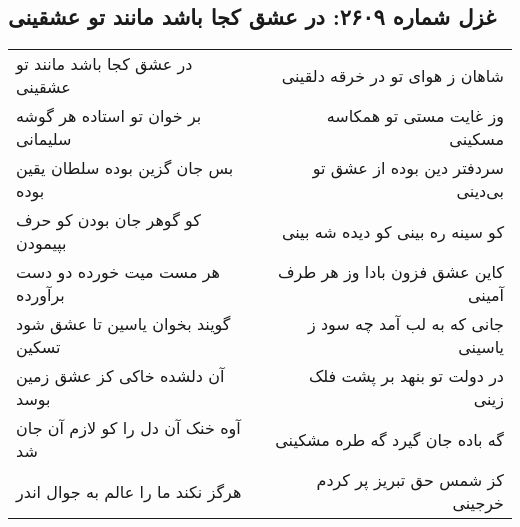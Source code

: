\begin{center}
\section*{غزل شماره ۲۶۰۹: در عشق کجا باشد مانند تو عشقینی}
\label{sec:2609}
\begin{longtable}{l p{0.5cm} r}
در عشق کجا باشد مانند تو عشقینی
&&
شاهان ز هوای تو در خرقه دلقینی
\\
بر خوان تو استاده هر گوشه سلیمانی
&&
وز غایت مستی تو همکاسه مسکینی
\\
بس جان گزین بوده سلطان یقین بوده
&&
سردفتر دین بوده از عشق تو بی‌دینی
\\
کو گوهر جان بودن کو حرف بپیمودن
&&
کو سینه ره بینی کو دیده شه بینی
\\
هر مست میت خورده دو دست برآورده
&&
کاین عشق فزون بادا وز هر طرف آمینی
\\
گویند بخوان یاسین تا عشق شود تسکین
&&
جانی که به لب آمد چه سود ز یاسینی
\\
آن دلشده خاکی کز عشق زمین بوسد
&&
در دولت تو بنهد بر پشت فلک زینی
\\
آوه خنک آن دل را کو لازم آن جان شد
&&
گه باده جان گیرد گه طره مشکینی
\\
هرگز نکند ما را عالم به جوال اندر
&&
کز شمس حق تبریز پر کردم خرجینی
\\
\end{longtable}
\end{center}
